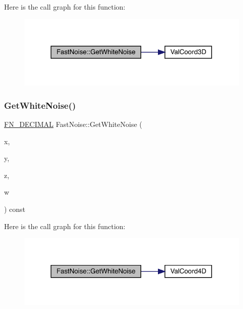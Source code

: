 Here is the call graph for this function\+:
\nopagebreak
\begin{figure}[H]
\begin{center}
\leavevmode
\includegraphics[width=320pt]{class_fast_noise_a661febd01ba99e06b9de5fab9bd13fb0_cgraph}
\end{center}
\end{figure}
\mbox{\label{class_fast_noise_a39fd417e39c49b29e8ab69381c74974d}} 
\subsubsection{\texorpdfstring{Get\+White\+Noise()}{GetWhiteNoise()}\hspace{0.1cm}{\footnotesize\ttfamily [3/3]}}
{\footnotesize\ttfamily \mbox{\hyperlink{_fast_noise_8h_a75a9ef6d2541c4921815b885bfd449c3}{F\+N\+\_\+\+D\+E\+C\+I\+M\+AL}} Fast\+Noise\+::\+Get\+White\+Noise (\begin{DoxyParamCaption}\item[{\mbox{\hyperlink{_fast_noise_8h_a75a9ef6d2541c4921815b885bfd449c3}{F\+N\+\_\+\+D\+E\+C\+I\+M\+AL}}}]{x,  }\item[{\mbox{\hyperlink{_fast_noise_8h_a75a9ef6d2541c4921815b885bfd449c3}{F\+N\+\_\+\+D\+E\+C\+I\+M\+AL}}}]{y,  }\item[{\mbox{\hyperlink{_fast_noise_8h_a75a9ef6d2541c4921815b885bfd449c3}{F\+N\+\_\+\+D\+E\+C\+I\+M\+AL}}}]{z,  }\item[{\mbox{\hyperlink{_fast_noise_8h_a75a9ef6d2541c4921815b885bfd449c3}{F\+N\+\_\+\+D\+E\+C\+I\+M\+AL}}}]{w }\end{DoxyParamCaption}) const}

Here is the call graph for this function\+:
\nopagebreak
\begin{figure}[H]
\begin{center}
\leavevmode
\includegraphics[width=320pt]{class_fast_noise_a39fd417e39c49b29e8ab69381c74974d_cgraph}
\end{center}
\end{figure}
\mbox{\label{class_fast_noise_a7a9d98438239800363188c7219bb26bc}} 
